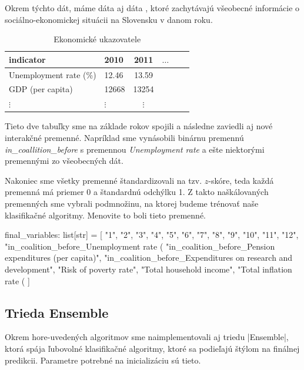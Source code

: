 \documentclass[report.tex]{subfiles}
\begin{document}
Okrem týchto  dát, máme dáta aj dáta , ktoré zachytávajú všeobecné informácie o sociálno-ekonomickej situácii na Slovensku v danom roku. 


\begin{table}[h!]
    \centering
    \caption{Ekonomické ukazovatele}
    \begin{tabular}{llcccl}
        \toprule
        \textbf{indicator} & \textbf{2010} & \textbf{2011} & $\ldots$ \\
        \midrule
        Unemployment rate (\%) & 12.46    & 13.59  \\
        GDP (per capita)       & 12668    & 13254 \\
        $\vdots$               & $\vdots$ & $\vdots$ \\ 
        \bottomrule
    \end{tabular}
\end{table}

Tieto dve tabuľky sme na základe rokov spojili a následne zaviedli aj nové interakčné premenné. Napríklad sme vynásobili binárnu premennú \textit{in\_coallition\_before} s premennou \textit{Unemployment rate} a ešte niektorými premennými zo všeobecných dát.

Nakoniec sme všetky premenné štandardizovali na tzv. $z$-skóre, teda každá premenná má priemer 0 a štandardnú odchýlku 1. Z takto naškálovaných premenných sme vybrali podmnožinu, na ktorej budeme trénovať naše klasifikačné algoritmy. Menovite to boli tieto premenné.

\begin{python}
    final_variables: list[str] = [
        "1", "2", "3", "4", "5", "6", "7", "8", "9", "10", "11", "12",
        "in_coalition_before_Unemployment rate (%
        "in_coalition_before_Pension expenditures (per capita)",
        "in_coalition_before_Expenditures on research and development",
        "Risk of poverty rate", "Total household income", 
        "Total inflation rate (%
    ]
\end{python}

\subsection{Trieda Ensemble}
Okrem hore-uvedených algoritmov sme naimplementovali aj triedu \pyth|Ensemble|, ktorá spája ľubovolné klasifikačné algoritmy, ktoré sa podieľajú štýlom  na finálnej predikcii. 
Parametre potrebné na inicializáciu sú tieto.
\end{document}
